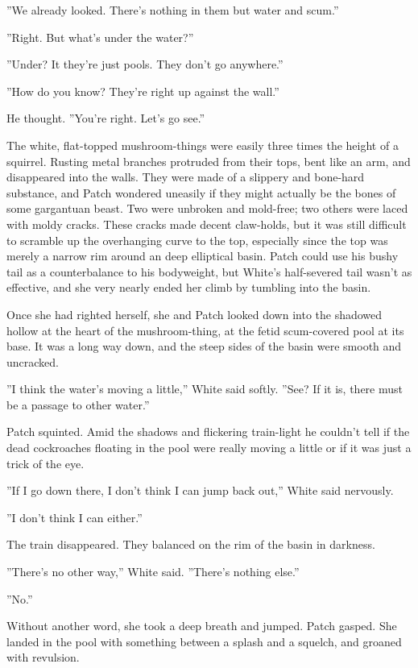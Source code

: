 \documentclass[12pt]{book}
\begin{document}
''We already looked. There's nothing in them but water and scum.''

''Right. But what's under the water?''

''Under? It %
they're just pools. They don't go anywhere.''

''How do you know? They're right up against the wall.''

He thought. ''You're right. Let's go see.''

The white, flat-topped mushroom-things were easily three times the height of a squirrel. Rusting metal branches protruded from their tops, bent like an arm, and disappeared into the walls. They were made of a slippery and bone-hard substance, and Patch wondered uneasily if they might actually be the bones of some gargantuan beast. Two were unbroken and mold-free; two others were laced with moldy cracks. These cracks made decent claw-holds, but it was still difficult to scramble up the overhanging curve to the top, especially since the top was merely a narrow rim around an deep elliptical basin. Patch could use his bushy tail as a counterbalance to his bodyweight, but White's half-severed tail wasn't as effective, and she very nearly ended her climb by tumbling into the basin.

Once she had righted herself, she and Patch looked down into the shadowed hollow at the heart of the mushroom-thing, at the fetid scum-covered pool at its base. It was a long way down, and the steep sides of the basin were smooth and uncracked.

''I think the water's moving a little,'' White said softly. ''See? If it is, there must be a passage to other water.''

Patch squinted. Amid the shadows and flickering train-light he couldn't tell if the dead cockroaches floating in the pool were really moving a little or if it was just a trick of the eye.

''If I go down there, I don't think I can jump back out,'' White said nervously.

''I don't think I can either.''

The train disappeared. They balanced on the rim of the basin in darkness.

''There's no other way,'' White said. ''There's nothing else.''

''No.''

Without another word, she took a deep breath and jumped. Patch gasped. She landed in the pool with something between a splash and a squelch, and groaned with revulsion.
\end{document}
